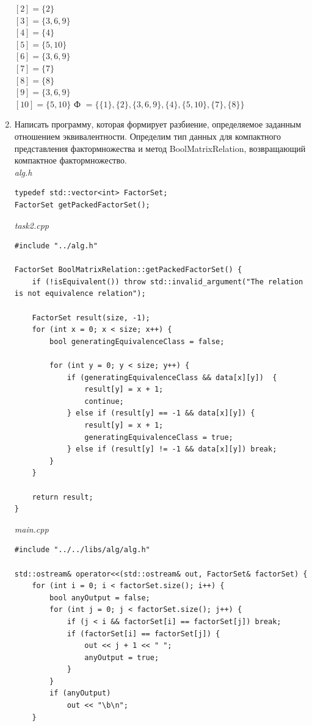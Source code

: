 \documentclass[a4paper,14pt]{extarticle}
\begin{document}
\begin{enumerate}[1.]
	      $[2] = \{2\}$\\
	      $[3] = \{3, 6, 9\}$\\
	      $[4] = \{4\}$\\
	      $[5] = \{5, 10\}$\\
	      $[6] = \{3, 6, 9\}$\\
	      $[7] = \{7\}$\\
	      $[8] = \{8\}$\\
	      $[9] = \{3, 6, 9\}$\\
	      $[10] = \{5, 10\}$\bigbreak
	      $\textit{Ф }=\{\{1\}, \{2\}, \{3, 6, 9\}, \{4\}, \{5, 10\}, \{7\}, \{8\}\}$
	\item Написать программу, которая формирует разбиение, определяемое заданным отношением эквивалентности.
	      Определим тип данных для компактного представления фактормножества и метод BoolMatrixRelation, возвращающий компактное фактормножество.\\
	      \textit{alg.h}
	      \begin{verbatim}
typedef std::vector<int> FactorSet;
FactorSet getPackedFactorSet();
	\end{verbatim}
	      \textit{task2.cpp}
	      \begin{verbatim}
#include "../alg.h"

FactorSet BoolMatrixRelation::getPackedFactorSet() {
    if (!isEquivalent()) throw std::invalid_argument("The relation is not equivalence relation");

    FactorSet result(size, -1);
    for (int x = 0; x < size; x++) {
        bool generatingEquivalenceClass = false;

        for (int y = 0; y < size; y++) {
            if (generatingEquivalenceClass && data[x][y])  {
                result[y] = x + 1;
                continue;
            } else if (result[y] == -1 && data[x][y]) {
                result[y] = x + 1;
                generatingEquivalenceClass = true;
            } else if (result[y] != -1 && data[x][y]) break;
        }
    }

    return result;
}
			\end{verbatim}
	      \textit{main.cpp}
	      \begin{verbatim}
#include "../../libs/alg/alg.h"

std::ostream& operator<<(std::ostream& out, FactorSet& factorSet) {
    for (int i = 0; i < factorSet.size(); i++) {
        bool anyOutput = false;
        for (int j = 0; j < factorSet.size(); j++) {
            if (j < i && factorSet[i] == factorSet[j]) break;
            if (factorSet[i] == factorSet[j]) { 
                out << j + 1 << " "; 
                anyOutput = true;
            }
        }
        if (anyOutput) 
            out << "\b\n";
    }


\end{verbatim}
\end{enumerate}
\end{document}
